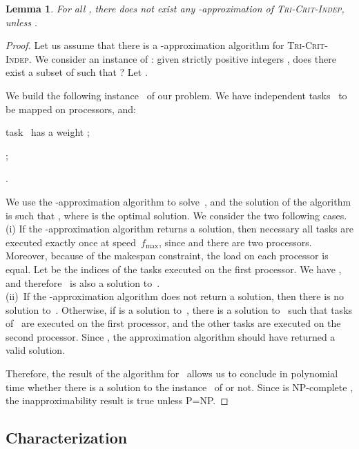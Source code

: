 \documentclass[a4paper]{article}
\theoremstyle{plain}
\newtheorem{lemma}{Lemma}
\theoremstyle{definition}
\theoremstyle{remark}
\newcommand{\fmax}{\ensuremath{f_{\max}}\xspace}
\newcommand{\indep}{\textsc{Tri-Crit-In\-dep}\xspace}
\begin{document}
\begin{lemma}
    \label{indep.inapprox}
For all , there does not exist any -approxi\-mation
of \indep, unless . 
\end{lemma}

\begin{proof}
Let us assume that there is a -approxi\-mation algorithm for
\indep. 
We consider an instance  of \partition: given  strictly positive 
integers , does there exist a subset  of  
such that ? Let
.

We build the following instance~ of our problem. We have  
independent tasks~ to be mapped on  processors, and: 
\begin{compactitem}
\item task~ has a weight ;
\item ; 
\item .
\end{compactitem}

\medskip
We use the -approxi\-mation algorithm to solve~, and the
solution of the algorithm  is such that , where  is the optimal solution. 
We consider the two following cases.\\ 
(i) If the -approxi\-mation algorithm returns a solution, then
necessary all tasks are executed exactly once at speed~\fmax, since
 and there are two processors. Moreover,
because of the makespan constraint, the load on each processor is
equal. Let  be the indices of the tasks executed on the first
processor. We have , and
therefore ~is also a solution to~. \\
(ii)~If  the -approxi\-mation algorithm does not return a
solution, then there is no solution to~. Otherwise, if  is a
solution to~, there is a solution to~ such that tasks
of~ are executed on the first processor, and the other tasks are
executed on the second processor. Since ,
the approximation algorithm should have returned a valid solution.  

Therefore, the result of the algorithm for~ allows us to
conclude in polynomial time whether there is a solution to the
instance~ of \partition or not. Since \partition is
NP-complete \cite{GareyJohnson}, the inapproximability result is true
unless P=NP. 
\end{proof}



\subsection{Characterization}
\label{char.indep}
\end{document}
